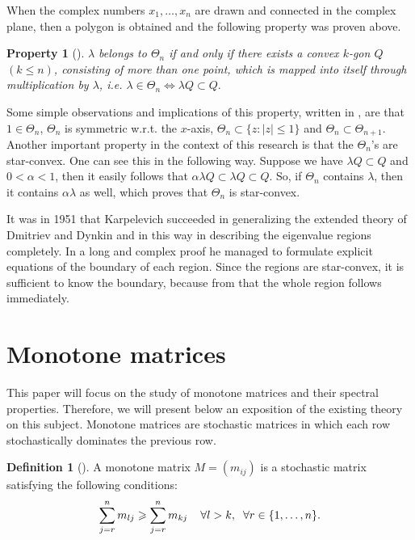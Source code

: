 \documentclass[11pt,a4paper]{article}
\newtheorem{property}[theorem]{Property}
\theoremstyle{definition}
\newtheorem{definition}{Definition}[section]
\theoremstyle{remark}
\begin{document}
When the complex numbers \(x_1, \ldots , x_n\) are drawn and connected in the complex plane, then a polygon is obtained and the following property was proven above.

\begin{property}[\cite{Dynkin}]
    \(\lambda\) belongs to \(\Theta_n\) if and only if there exists a convex \(k\)-gon \(Q\) \((k \leqslant n)\), consisting of more than one point, which is mapped into itself through multiplication by \(\lambda\), i.e. \( \lambda \in \Theta_n \Longleftrightarrow \lambda Q \subset Q .\)
\end{property}

Some simple observations and implications of this property, written in \cite{Dynkin}, are that \(1 \in \Theta_n\), \(\Theta_n\) is symmetric w.r.t. the \(x\)-axis,  \(\Theta_n \subset \{z : |z| \leqslant 1\}\) and \(\Theta_n \subset \Theta_{n+1}\). Another important property in the context of this research is that the \(\Theta_n\)'s are star-convex. One can see this in the following way. Suppose we have \(\lambda Q \subset Q\) and \(0 < \alpha < 1 \), then it easily follows that \( \alpha \lambda Q \subset \lambda Q \subset Q \). So, if \(\Theta_n\) contains \(\lambda\), then it contains \(\alpha \lambda\) as well, which proves that \(\Theta_n\) is star-convex.

It was in 1951 that Karpelevich \cite{Karpelevich} succeeded in generalizing the extended theory of Dmitriev and Dynkin and in this way in describing the eigenvalue regions completely. In a long and complex proof he managed to formulate explicit equations of the boundary of each region. Since the regions are star-convex, it is sufficient to know the boundary, because from that the whole region follows immediately.

\section{Monotone matrices}\label{Monotone matrices}
This paper will focus on the study of monotone matrices and their spectral properties. Therefore, we will present below an exposition of the existing theory on this subject.
Monotone matrices are stochastic matrices in which each row stochastically dominates the previous row.

\begin{definition}[\cite{daley1968stochastically}]\label{MonotoneMatrix}
    A monotone matrix \(M =(m_{ij})\) is a stochastic matrix satisfying the following conditions:
    \[\sum_{j=r}^n m_{lj} \geqslant \sum_{j=r}^n m_{kj} \hspace{4mm} \forall l > k, \hspace{2mm} \forall r \in \{1, \ldots, n \} .\]
\end{definition}
\end{document}
